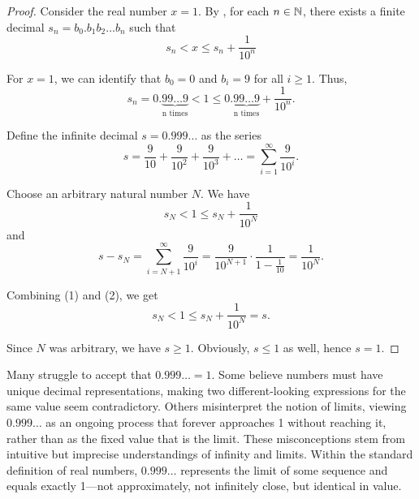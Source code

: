 \begin{proof}
  Consider the real number $x = 1$. By ,
  for each $n \in \mathbb N$, there exists a finite decimal $s_n = b_0. b_1
  b_2 \ldots b_n$ such that
  \[ s_n < x \leq s_n + \frac{1}{10^n} \]

  For $x = 1$, we can identify that $b_0 = 0$ and $b_i = 9$ for all
  $i \geq 1$. Thus,
  \[ s_n = 0.\underbrace{99\ldots9}_{\text{n times}} < 1 \leq
  0.\underbrace{99\ldots9}_{\text{n times}} + \frac{1}{10^n}. \]

  Define the infinite decimal $s = 0.999\ldots$ as the series
  \[ s = \frac{9}{10} + \frac{9}{10^2} + \frac{9}{10^3} + \dots =
  \sum_{i=1}^{\infty}\frac{9}{10^i}. \]

  Choose an arbitrary natural number $N$. We have
  \[ s_N < 1 \leq s_N + \frac{1}{10^N} \tag{1} \]
  and
  \[ s - s_N = \sum_{i=N+1}^{\infty}\frac{9}{10^i} =
  \frac{9}{10^{N+1}} \cdot \frac{1}{1-\frac{1}{10}} = \frac{1}{10^N}. \tag{2} \]

  Combining (1) and (2), we get
  \[ s_N < 1 \leq s_N + \frac{1}{10^N} = s. \]

  Since $N$ was arbitrary, we have $s \geq 1$. Obviously, $s \leq 1$
  as well, hence $s = 1$.
\end{proof}

\begin{remark}
  Many struggle to accept that $0.999\ldots = 1$. Some believe
  numbers must have unique decimal representations, making two
  different-looking expressions for the same value seem
  contradictory. Others misinterpret the notion of limits, viewing
  $0.999\ldots$ as an ongoing process that forever approaches 1
  without reaching it, rather than as the fixed value that is the
  limit. These misconceptions stem from intuitive but imprecise
  understandings of infinity and limits. Within the standard definition
  of real numbers, $0.999\ldots$ represents the limit of some
  sequence and equals exactly 1---not approximately, not infinitely
  close, but identical in value.
\end{remark}
